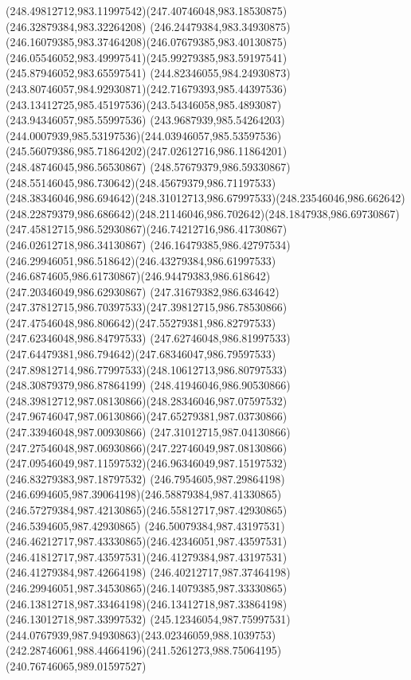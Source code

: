 {{  \curveto(248.49812712,983.11997542)(247.40746048,983.18530875)(246.32879384,983.32264208)
  \curveto(246.24479384,983.34930875)(246.16079385,983.37464208)(246.07679385,983.40130875)
  \curveto(246.05546052,983.49997541)(245.99279385,983.59197541)(245.87946052,983.65597541)
  \curveto(244.82346055,984.24930873)(243.80746057,984.92930871)(242.71679393,985.44397536)
  \curveto(243.13412725,985.45197536)(243.54346058,985.4893087)(243.94346057,985.55997536)
  \curveto(243.9687939,985.54264203)(244.0007939,985.53197536)(244.03946057,985.53597536)
  \curveto(245.56079386,985.71864202)(247.02612716,986.11864201)(248.48746045,986.56530867)
  \curveto(248.57679379,986.59330867)(248.55146045,986.730642)(248.45679379,986.71197533)
  \curveto(248.38346046,986.694642)(248.31012713,986.67997533)(248.23546046,986.662642)
  \curveto(248.22879379,986.686642)(248.21146046,986.702642)(248.1847938,986.69730867)
  \curveto(247.45812715,986.52930867)(246.74212716,986.41730867)(246.02612718,986.34130867)
  \curveto(246.16479385,986.42797534)(246.29946051,986.518642)(246.43279384,986.61997533)
  \curveto(246.6874605,986.61730867)(246.94479383,986.618642)(247.20346049,986.62930867)
  \curveto(247.31679382,986.634642)(247.37812715,986.70397533)(247.39812715,986.78530866)
  \curveto(247.47546048,986.806642)(247.55279381,986.82797533)(247.62346048,986.84797533)
  \curveto(247.62746048,986.81997533)(247.64479381,986.794642)(247.68346047,986.79597533)
  \curveto(247.89812714,986.77997533)(248.10612713,986.80797533)(248.30879379,986.87864199)
  \curveto(248.41946046,986.90530866)(248.39812712,987.08130866)(248.28346046,987.07597532)
  \curveto(247.96746047,987.06130866)(247.65279381,987.03730866)(247.33946048,987.00930866)
  \curveto(247.31012715,987.04130866)(247.27546048,987.06930866)(247.22746049,987.08130866)
  \curveto(247.09546049,987.11597532)(246.96346049,987.15197532)(246.83279383,987.18797532)
  \curveto(246.7954605,987.29864198)(246.6994605,987.39064198)(246.58879384,987.41330865)
  \curveto(246.57279384,987.42130865)(246.55812717,987.42930865)(246.5394605,987.42930865)
  \curveto(246.50079384,987.43197531)(246.46212717,987.43330865)(246.42346051,987.43597531)
  \curveto(246.41812717,987.43597531)(246.41279384,987.43197531)(246.41279384,987.42664198)
  \curveto(246.40212717,987.37464198)(246.29946051,987.34530865)(246.14079385,987.33330865)
  \curveto(246.13812718,987.33464198)(246.13412718,987.33864198)(246.13012718,987.33997532)
  \curveto(245.12346054,987.75997531)(244.0767939,987.94930863)(243.02346059,988.1039753)
  \curveto(242.28746061,988.44664196)(241.5261273,988.75064195)(240.76746065,989.01597527)
}}
